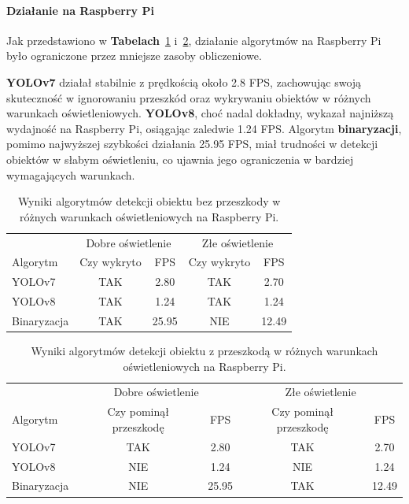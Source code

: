 \documentclass[a4paper,twoside,12pt]{book}
\begin{document}
\newpage

\paragraph{Działanie na Raspberry Pi}
Jak przedstawiono w \textbf{Tabelach}~\ref{tab:bez_przeszkody_rpi} i~\ref{tab:z_przeszkoda_rpi}, działanie algorytmów na Raspberry Pi było ograniczone przez mniejsze zasoby obliczeniowe. 

\textbf{YOLOv7} działał stabilnie z prędkością około 2.8 FPS, zachowując swoją skuteczność w ignorowaniu przeszkód oraz wykrywaniu obiektów w różnych warunkach oświetleniowych. \textbf{YOLOv8}, choć nadal dokładny, wykazał najniższą wydajność na Raspberry Pi, osiągając zaledwie 1.24 FPS. Algorytm \textbf{binaryzacji}, pomimo najwyższej szybkości działania 25.95 FPS, miał trudności w detekcji obiektów w słabym oświetleniu, co ujawnia jego ograniczenia w bardziej wymagających warunkach.

\begin{table}[h!]
    \centering
    \caption{Wyniki algorytmów detekcji obiektu bez przeszkody w różnych warunkach oświetleniowych na Raspberry Pi.}
    \label{tab:bez_przeszkody_rpi}
    \begin{tabular}{lcccc}
    \toprule
     & \multicolumn{2}{c}{Dobre oświetlenie} & \multicolumn{2}{c}{Złe oświetlenie} \\
    \cmidrule(r){2-3} \cmidrule(r){4-5}
    Algorytm & Czy wykryto & FPS & Czy wykryto & FPS \\
    \midrule
    YOLOv7 & TAK & 2.80 & TAK & 2.70 \\
    YOLOv8 & TAK & 1.24 & TAK & 1.24 \\
    Binaryzacja & TAK & 25.95 & NIE & 12.49 \\
    \bottomrule
    \end{tabular}
\end{table}

\begin{table}[h!]
    \centering
    \caption{Wyniki algorytmów detekcji obiektu z przeszkodą w różnych warunkach oświetleniowych na Raspberry Pi.}
    \label{tab:z_przeszkoda_rpi}
    \begin{tabular}{lcccc}
    \toprule
     & \multicolumn{2}{c}{Dobre oświetlenie} & \multicolumn{2}{c}{Złe oświetlenie} \\
    \cmidrule(r){2-3} \cmidrule(r){4-5}
    Algorytm & Czy pominął przeszkodę & FPS & Czy pominął przeszkodę & FPS \\
    \midrule
    YOLOv7 & TAK & 2.80 & TAK & 2.70 \\
    YOLOv8 & NIE & 1.24 & NIE & 1.24 \\
    Binaryzacja & NIE & 25.95 & TAK & 12.49 \\
    \bottomrule
    \end{tabular}
\end{table}
\end{document}

